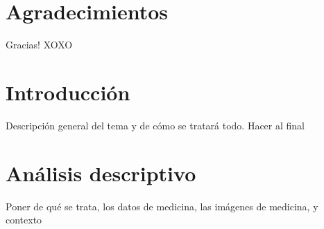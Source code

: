 \documentclass[11pt]{book}
\begin{document}
\chapter*{Agradecimientos}

Gracias! XOXO



\tableofcontents



\mainmatter %
\pagestyle{headings}



\chapter{Introducción}  
Descripción general del tema y de cómo se tratará todo. Hacer al final

\thispagestyle{empty}
\chapter{Análisis descriptivo} 

	Poner de qué se trata, los datos de medicina, las imágenes de medicina, y contexto
	
	

\thispagestyle{empty}

\thispagestyle{empty}







\appendix %

\end{document}
